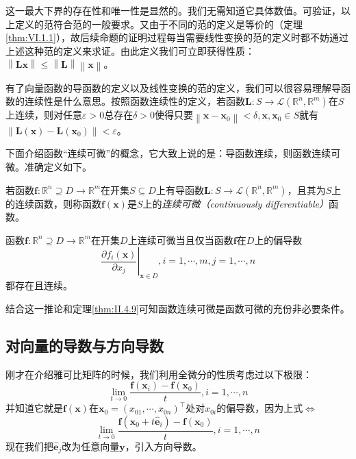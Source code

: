 \documentclass[main.tex]{subfiles}
\begin{document}
这一最大下界的存在性和唯一性是显然的。我们无需知道它具体数值。可验证，以上定义的范符合范的一般要求。又由于不同的范的定义是等价的（定理\ref{thm:VI.1.1}），故后续命题的证明过程每当需要线性变换的范的定义时都不妨通过上述这种范的定义来求证。由此定义我们可立即获得性质：$\left\|\mathbf{Lx}\right\|\leq\left\|\mathbf{L}\right\|\left\|\mathbf{x}\right\|$。

有了向量函数的导函数的定义以及线性变换的范的定义，我们可以很容易理解导函数的连续性是什么意思。按照函数连续性的定义，若函数$\mathbf{L}:S\rightarrow\mathcal{L}\left(\mathbb{R}^n,\mathbb{R}^m\right)$在$S$上连续，则对任意$\varepsilon>0$总存在$\delta>0$使得只要$\left\|\mathbf{x}-\mathbf{x}_0\right\|<\delta,\mathbf{x},\mathbf{x}_0\in S$就有$\left\|\mathbf{L}\left(\mathbf{x}\right)-\mathbf{L}\left(\mathbf{x}_0\right)\right\|<\varepsilon$。

下面介绍函数“连续可微”的概念，它大致上说的是：导函数连续，则函数连续可微。准确定义如下。

\begin{definition}[连续可微函数]\label{def:II.4.17}
    若函数$\mathbf{f}:\mathbb{R}^n\supseteq D\rightarrow\mathbb{R}^m$在开集$S\subseteq D$上有导函数$\mathbf{L}:S\rightarrow\mathcal{L}\left(\mathbb{R}^n,\mathbb{R}^m\right)$，且其为$S$上的连续函数，则称函数$\mathbf{f}\left(\mathbf{x}\right)$是$S$上的\emph{连续可微（continuously differentiable）}函数。
\end{definition}

\begin{corollary}
    函数$\mathbf{f}:\mathbb{R}^n\supseteq D\rightarrow\mathbb{R}^m$在开集$D$上连续可微当且仅当函数$\mathbf{f}$在$D$上的偏导数
    \[
        \left.\frac{\partial f_i\left(\mathbf{x}\right)}{\partial x_j}\right|_{\mathbf{x}\in D},i=1,\cdots,m,j=1,\cdots,n
    \]
    都存在且连续。
\end{corollary}

结合这一推论和定理\ref{thm:II.4.9}可知函数连续可微是函数可微的充份非必要条件。

\subsection{对向量的导数与方向导数}
刚才在介绍雅可比矩阵的时候，我们利用全微分的性质考虑过以下极限：
\[
    \lim_{t\to 0}\frac{\mathbf{f}\left(\mathbf{x}_i\right)-\mathbf{f}\left(\mathbf{x}_0\right)}{t},i=1,\cdots,n\]
并知道它就是$\mathbf{f}\left(\mathbf{x}\right)$在$\mathbf{x}_0=\left(x_{01},\cdots,x_{0n}\right)^\intercal$处对$x_{0i}$的偏导数，因为上式$\Leftrightarrow$
\[
    \lim_{t\rightarrow 0}\frac{\mathbf{f}\left(\mathbf{x}_0+t\mathbf{\hat{e}}_i\right)-\mathbf{f}\left(\mathbf{x}_0\right)}{t},i=1,\cdots,n
\]
现在我们把$\mathbf{\hat{e}}_j$改为任意向量$\mathbf{y}$，引入方向导数。
\end{document}
